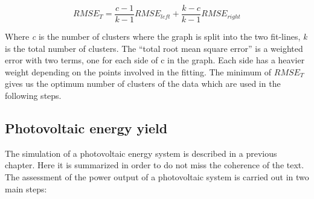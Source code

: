 \begin{itemize}
\begin{equation}\label{eq:total_RMSE}
  RMSE_T = \frac{c-1}{k-1}RMSE_{left}+\frac{k-c}{k-1}RMSE_{right}
\end{equation}



Where \textit{c} is the number of clusters where the graph is split into the two fit-lines, \textit{k} is the total number of clusters. The ``total root mean square error'' is a weighted error with two terms, one for each side of c in the graph. Each side has a heavier weight depending on the points involved in the fitting. The minimum of $RMSE_{T}$ gives us the optimum number of clusters of the data \cite*{Zagouras2013} which are used in the following steps.
 
\end{itemize}
 
\subsection{Photovoltaic energy yield}

The simulation of a photovoltaic energy system is described in a previous chapter. Here it is summarized in order to do not miss the coherence of the text.\\

The assessment of the power output of a photovoltaic system is carried out in two main steps:

